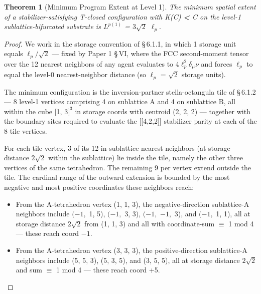 \documentclass[11pt,oneside]{report}
\newtheorem{theorem}{Theorem}[section]
\theoremstyle{definition}
\theoremstyle{remark}
\begin{document}
\begin{theorem}[Minimum Program Extent at Level 1]
The minimum
spatial extent of a stabilizer-satisfying T-closed configuration with
K(C) \textbf{\textless{}} \textbar C\textbar{} on the level-1
sublattice-bifurcated substrate is \ensuremath{L^{p(1)}} = \ensuremath{3\sqrt{2}} \ensuremath{\ell_{p}.}
\end{theorem}

\begin{proof}
We work in the storage convention of \S\,6.1.1, in which 1
storage unit equals \ensuremath{\ell_{p}/\sqrt{2}} --- fixed by Paper 1 \S\,VI, where the FCC
second-moment tensor over the 12 nearest neighbors of any agent
evaluates to \ensuremath{4\ell^{2}_{p}\delta_{\mu}\nu} and forces \ensuremath{\ell_{p}} to equal the level-0
nearest-neighbor distance (so \ensuremath{\ell_{p}} = \ensuremath{\sqrt{2}} storage units).

The minimum configuration is the inversion-partner stella-octangula tile
of \S\,6.1.2 --- 8 level-1 vertices comprising 4 on sublattice A and 4 on
sublattice B, all within the cube [1, \ensuremath{3]^{3}} in storage coords with
centroid (2, 2, 2) --- together with the boundary sites required to
evaluate the [[4,2,2]] stabilizer parity at each of the 8 tile
vertices.

For each tile vertex, 3 of its 12 in-sublattice nearest neighbors (at
storage distance \ensuremath{2\sqrt{2}} within the sublattice) lie inside the tile, namely
the other three vertices of the same tetrahedron. The remaining 9 per
vertex extend outside the tile. The cardinal range of the outward
extension is bounded by the most negative and most positive coordinates
these neighbors reach:

\begin{itemize}
\item
  From the A-tetrahedron vertex (1, 1, 3), the negative-direction
  sublattice-A neighbors include \ensuremath{(-1,} 1, 5), \ensuremath{(-1,} 3, 3), \ensuremath{(-1,} \ensuremath{-1,} 3),
  and \ensuremath{(-1,} 1, 1), all at storage distance \ensuremath{2\sqrt{2}} from (1, 1, 3) and all
  with coordinate-sum \ensuremath{\equiv} 1 mod 4 --- these reach coord \ensuremath{-1.}
\end{itemize}

\begin{itemize}
\item
  From the A-tetrahedron vertex (3, 3, 3), the positive-direction
  sublattice-A neighbors include (5, 5, 3), (5, 3, 5), and (3, 5, 5),
  all at storage distance \ensuremath{2\sqrt{2}} and sum \ensuremath{\equiv} 1 mod 4 --- these reach coord
  +5.
\end{itemize}


\end{proof}
\end{document}
